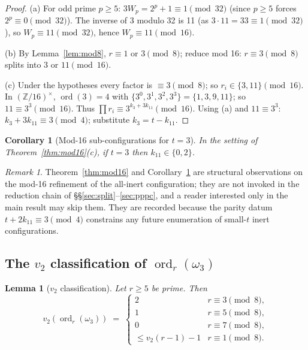 \documentclass[11pt]{amsart}
\theoremstyle{plain}
\newtheorem{lemma}[theorem]{Lemma}
\newtheorem{corollary}[theorem]{Corollary}
\theoremstyle{definition}
\theoremstyle{remark}
\newtheorem*{remarknonum}{Remark}
\numberwithin{equation}{section}
\newcommand{\ord}{\operatorname{ord}}
\newcommand{\Z}{\mathbb{Z}}
\begin{document}
\begin{proof}
(a) For odd prime $p \geq 5$: $3 W_p = 2^p + 1 \equiv 1 \pmod{32}$ (since $p \geq 5$ forces $2^p \equiv 0 \pmod{32}$). The inverse of 3 modulo 32 is 11 (as $3 \cdot 11 = 33 \equiv 1 \pmod{32}$), so $W_p \equiv 11 \pmod{32}$, hence $W_p \equiv 11 \pmod{16}$.

(b) By Lemma~\ref{lem:mod8}, $r \equiv 1$ or $3 \pmod 8$; reduce mod 16: $r \equiv 3 \pmod 8$ splits into $3$ or $11 \pmod{16}$.

(c) Under the hypotheses every factor is $\equiv 3 \pmod 8$; so $r_i \in \{3, 11\} \pmod{16}$. In $(\Z/16)^\times$, $\ord(3) = 4$ with $\{3^0, 3^1, 3^2, 3^3\} = \{1, 3, 9, 11\}$; so $11 \equiv 3^3 \pmod{16}$. Thus $\prod r_i \equiv 3^{k_3 + 3 k_{11}} \pmod{16}$. Using (a) and $11 \equiv 3^3$: $k_3 + 3 k_{11} \equiv 3 \pmod 4$; substitute $k_3 = t - k_{11}$.
\end{proof}

\begin{corollary}[Mod-16 sub-configurations for $t = 3$]\label{cor:mod16-t3}
In the setting of Theorem~\ref{thm:mod16}(c), if $t = 3$ then $k_{11} \in \{0, 2\}$.
\end{corollary}

\begin{remarknonum}
Theorem~\ref{thm:mod16} and Corollary~\ref{cor:mod16-t3} are structural observations on the mod-16 refinement of the all-inert configuration; they are not invoked in the reduction chain of \S\S\ref{sec:split}--\ref{sec:pppc}, and a reader interested only in the main result may skip them. They are recorded because the parity datum $t + 2 k_{11} \equiv 3 \pmod 4$ constrains any future enumeration of small-$t$ inert configurations.
\end{remarknonum}

\subsection{The \texorpdfstring{$v_2$}{v2} classification of \texorpdfstring{$\ord_r(\omega_3)$}{ord r(omega 3)}}

\begin{lemma}[$v_2$ classification]\label{lem:v2-class}
Let $r \geq 5$ be prime. Then
\[
  v_2(\ord_r(\omega_3)) \;=\; \begin{cases}
    2 & r \equiv 3 \pmod 8, \\
    1 & r \equiv 5 \pmod 8, \\
    0 & r \equiv 7 \pmod 8, \\
    \leq v_2(r - 1) - 1 & r \equiv 1 \pmod 8.
  \end{cases}
\]
\end{lemma}
\end{document}
